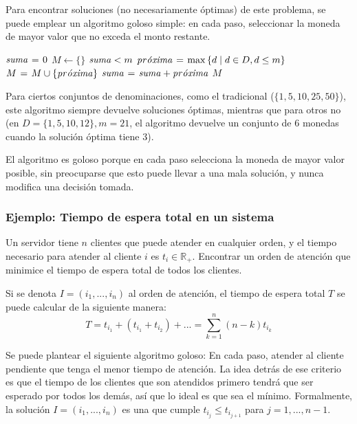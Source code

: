 \documentclass[a4paper]{report}
\newcommand{\R}{\mathbb{R}}
\begin{document}
Para encontrar soluciones (no necesariamente óptimas) de este problema, se puede emplear un algoritmo goloso simple: en cada paso, seleccionar la moneda de mayor valor que no exceda el monto restante.

\begin{codebox}
    \li $\id{suma} \gets 0$
    \li $M \gets \{\}$
    \li \While $\id{suma} < m$ \Do
    \li $\id{pr\acute{o}xima} \gets \max{\{d \mid d \in D, d \leq m\}}$
    \li $M \gets M \cup \{\id{pr\acute{o}xima\}}$
    \li $\id{suma} \gets \id{suma} + \id{pr\acute{o}xima}$
    \End
    \li \Return $M$
\end{codebox}

Para ciertos conjuntos de denominaciones, como el tradicional ($\{1, 5, 10, 25, 50\}$), este algoritmo siempre devuelve soluciones óptimas, mientras que para otros no (en $D = \{1, 5, 10, 12\}, m = 21$, el algoritmo devuelve un conjunto de $6$ monedas cuando la solución óptima tiene $3$).

El algoritmo es goloso porque en cada paso selecciona la moneda de mayor valor posible, sin preocuparse que esto puede llevar a una mala solución, y nunca modifica una decisión tomada.

\subsubsection{Ejemplo: Tiempo de espera total en un sistema}

\begin{problema}
    Un servidor tiene $n$ clientes que puede atender en cualquier orden, y el tiempo necesario para atender al cliente $i$ es $t_i \in \R_+$. Encontrar un orden de atención que minimice el tiempo de espera total de todos los clientes.
\end{problema}

Si se denota $I = (i_1, ..., i_n)$ al orden de atención, el tiempo de espera total $T$ se puede calcular de la siguiente manera:
$$T = t_{i_1} + (t_{i_1} + t_{i_2}) + ... = \sum_{k=1}^n (n - k) t_{i_k}$$

Se puede plantear el siguiente algoritmo goloso: En cada paso, atender al cliente pendiente que tenga el menor tiempo de atención. La idea detrás de ese criterio es que el tiempo de los clientes que son atendidos primero tendrá que ser esperado por todos los demás, así que lo ideal es que sea el mínimo. Formalmente, la solución $I = (i_1, ..., i_n)$ es una que cumple $t_{i_j} \leq t_{i_{j+1}}$ para $j = 1, ..., n - 1$.
\end{document}

